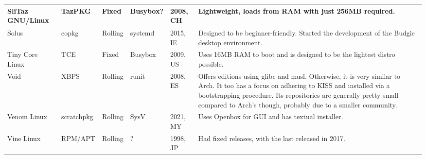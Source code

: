 \documentclass[12pt,a4paper,landscape]{article}
\begin{document}
\begin{longtable}{|p{3.5cm}|p{2.3cm}|p{1.6cm}|p{2.4cm}|p{2.0cm}|p{14.7cm}|}
			SliTaz GNU/Linux & TazPKG & Fixed & Busybox? & 2008, CH & Lightweight, loads from RAM with just 256MB required. \\\hline  
			Solus & eopkg & Rolling & systemd & 2015, IE & Designed to be beginner-friendly. Started the development of the Budgie desktop environment. \\\hline
			Tiny Core Linux & TCE & Fixed & Busybox & 2009, US & Uses 16MB RAM to boot and is designed to be the lightest distro possible. \\\hline
			Void & XBPS & Rolling & runit & 2008, ES & Offers editions using glibc and musl. Otherwise, it is very similar to Arch. It too has a focus on adhering to KISS and installed via a bootstrapping procedure. Its repositories are generally pretty small compared to Arch's though, probably due to a smaller community. \\\hline
			Venom Linux & scratchpkg & Rolling & SysV & 2021, MY & Uses Openbox for GUI and has textual installer. \\\hline
			Vine Linux & RPM/APT & Rolling & ? & 1998, JP & Had fixed releases, with the last released in 2017. \\\hline
	\end{longtable}
	
\end{document}
